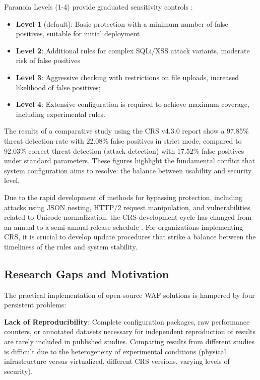 \documentclass[10pt,conference]{IEEEtran}
\begin{document}
Paranoia Levels (1-4) provide graduated sensitivity controls \cite{crs_paranoia}:

\begin{itemize}
\item \textbf{Level 1} (default): Basic protection with a minimum number of false positives, suitable for initial deployment
\item \textbf{Level 2}: Additional rules for complex SQLi/XSS attack variants, moderate risk of false positives
\item \textbf{Level 3}: Aggressive checking with restrictions on file uploads, increased likelihood of false positives;
\item \textbf{Level 4}: Extensive configuration is required to achieve maximum coverage, including experimental rules.
\end{itemize}

The results of a comparative study using the CRS v4.3.0 report show a 97.85\% threat detection rate with 22.08\% false positives in strict mode, compared to 92.03\% correct threat detection (attack detection) with 17.52\% false positives under standard parameters\cite{openappsec2024}. These figures highlight the fundamental conflict that system configuration aims to resolve: the balance between usability and security level.

Due to the rapid development of methods for bypassing protection, including attacks using JSON nesting, HTTP/2 request manipulation, and vulnerabilities related to Unicode normalization, the CRS development cycle has changed from an annual to a semi-annual release schedule \cite{crs_releases}. For organizations implementing CRS, it is crucial to develop update procedures that strike a balance between the timeliness of the rules and system stability.

\subsection{Research Gaps and Motivation}

The practical implementation of open-source WAF solutions is hampered by four persistent problems:

\textbf{Lack of Reproducibility}: Complete configuration packages, raw performance counters, or annotated datasets necessary for independent reproduction of results are rarely included in published studies. Comparing results from different studies is difficult due to the heterogeneity of experimental conditions (physical infrastructure versus virtualized, different CRS versions, varying levels of security).
\end{document}
